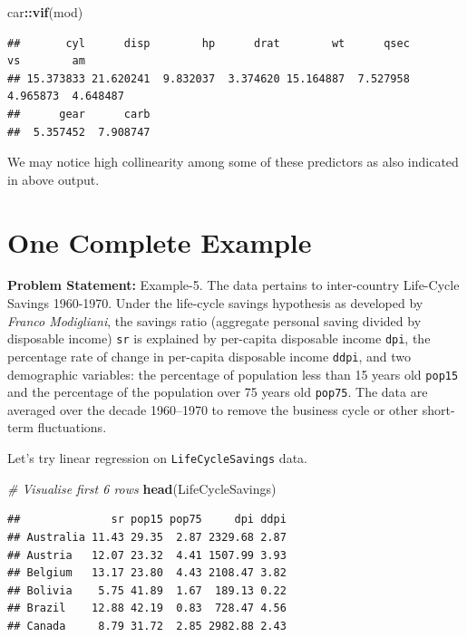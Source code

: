 \documentclass[
]{book}
\newenvironment{Shaded}{\begin{snugshade}}{\end{snugshade}}
\newcommand{\CommentTok}[1]{\textcolor[rgb]{0.56,0.35,0.01}{\textit{#1}}}
\newcommand{\FunctionTok}[1]{\textcolor[rgb]{0.13,0.29,0.53}{\textbf{#1}}}
\newcommand{\NormalTok}[1]{#1}
\newcommand{\SpecialCharTok}[1]{\textcolor[rgb]{0.81,0.36,0.00}{\textbf{#1}}}
\begin{document}
\begin{Shaded}
\begin{Highlighting}[]
\NormalTok{car}\SpecialCharTok{::}\FunctionTok{vif}\NormalTok{(mod)}
\end{Highlighting}
\end{Shaded}

\begin{verbatim}
##       cyl      disp        hp      drat        wt      qsec        vs        am 
## 15.373833 21.620241  9.832037  3.374620 15.164887  7.527958  4.965873  4.648487 
##      gear      carb 
##  5.357452  7.908747
\end{verbatim}

We may notice high collinearity among some of these predictors as also indicated in above output.

\hypertarget{one-complete-example}{%
\section{One Complete Example}\label{one-complete-example}}

\textbf{Problem Statement:} Example-5. The data pertains to inter-country Life-Cycle Savings 1960-1970. Under the life-cycle savings hypothesis as developed by \emph{Franco Modigliani}, the savings ratio (aggregate personal saving divided by disposable income) \texttt{sr} is explained by per-capita disposable income \texttt{dpi}, the percentage rate of change in per-capita disposable income \texttt{ddpi}, and two demographic variables: the percentage of population less than 15 years old \texttt{pop15} and the percentage of the population over 75 years old \texttt{pop75}. The data are averaged over the decade 1960--1970 to remove the business cycle or other short-term fluctuations.

Let's try linear regression on \texttt{LifeCycleSavings} data.

\begin{Shaded}
\begin{Highlighting}[]
\CommentTok{\# Visualise first 6 rows}
\FunctionTok{head}\NormalTok{(LifeCycleSavings)}
\end{Highlighting}
\end{Shaded}

\begin{verbatim}
##              sr pop15 pop75     dpi ddpi
## Australia 11.43 29.35  2.87 2329.68 2.87
## Austria   12.07 23.32  4.41 1507.99 3.93
## Belgium   13.17 23.80  4.43 2108.47 3.82
## Bolivia    5.75 41.89  1.67  189.13 0.22
## Brazil    12.88 42.19  0.83  728.47 4.56
## Canada     8.79 31.72  2.85 2982.88 2.43
\end{verbatim}
\end{document}
